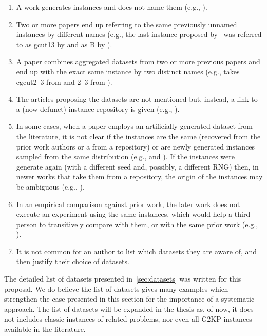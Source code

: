 \begin{enumerate}
\item A work generates instances and does not name them (e.g., \citet{beasley:1985:guillotine,wang:1983,cw:1977}).
\item Two or more papers end up referring to the same previously unnamed instances by different names (e.g., the last instance proposed by~\citet{beasley:1985:guillotine} was referred to as gcut13 by \citet{martello:1998} and as B by \citet{fekete:1997}).
\item A paper combines aggregated datasets from two or more previous papers and end up with the exact same instance by two distinct names (e.g., \citet{furini:2016} takes cgcut2--3 from \citet{dolatabadi:2012} and 2--3 from \citet{hifi:2001}).
\item The articles proposing the datasets are not mentioned but, instead, a link to a (now defunct) instance repository is given (e.g., \citet{hifi:2001}).
\item In some cases, when a paper employs an artificially generated dataset from the literature, it is not clear if the instances are the same (recovered from the prior work authors or a from a repository) or are newly generated instances sampled from the same distribution (e.g., \citet{martello:1998} and \citet{berkey:1987}). If the instances were generate again (with a different seed and, possibly, a different RNG) then, in newer works that take them from a repository, the origin of the instances may be ambiguous (e.g., \citet{alvarez:2009}).
\item In an empirical comparison against prior work, the later work does not execute an experiment using the same instances, which would help a third-person to transitively compare with them, or with the same prior work (e.g., \citet{martin:2020:bottom}).
\item It is not common for an author to list which datasets they are aware of, and then justify their choice of datasets.
\end{enumerate}

The detailed list of datasets presented in~\cref{sec:datasets} was written for this proposal.
We do believe the list of datasets gives many examples which strengthen the case presented in this section for the importance of a systematic approach.
The list of datasets will be expanded in the thesis as, of now, it does not includes classic instances of related problems, nor even all G2KP instances available in the literature.

